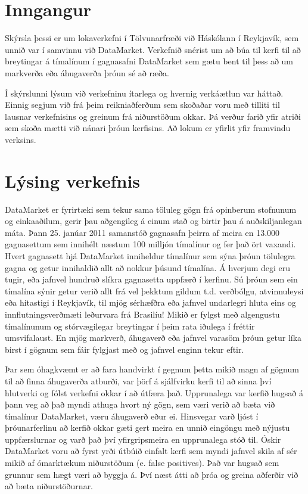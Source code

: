 \documentclass{article}
\begin{document}
\raggedright

\tableofcontents
\newpage

\section{Inngangur}
Skýrsla þessi er um lokaverkefni í Tölvunarfræði við Háskólann í
Reykjavík, 
sem unnið var í samvinnu við DataMarket. Verkefnið snérist um að búa til kerfi til að 
breytingar á tímalínum í gagnasafni DataMarket sem gætu bent til þess að um markverða eða áhugaverða þróun sé að ræða.

Í skýrslunni lýsum við verkefninu ítarlega og hvernig verkáætlun var háttað.
Einnig segjum við frá þeim reikniaðferðum sem skoðaðar voru með tilliti til 	
lausnar verkefnisins og greinum frá niðurstöðum okkar. Þá 
verður farið yfir atriði sem skoða mætti við nánari þróun kerfisins.
Að lokum er yfirlit yfir framvindu verksins.

\newpage
\section{Lýsing verkefnis}
\label{sec:description}
DataMarket er fyrirtæki sem tekur sama töluleg gögn frá opinberum
stofnunum og einkaaðilum, gerir þau aðgengileg á einum stað og birtir þau á
auðskiljanlegan máta. Þann 25. janúar 2011 samanstóð gagnasafn þeirra 
af meira en 13.000 gagnasettum sem innihélt næstum 100 milljón tímalínur og 
fer það ört vaxandi. Hvert gagnasett hjá DataMarket inniheldur tímalínur sem sýna þróun tölulegra
gagna og getur innihaldið allt að nokkur þúsund tímalína. 
Á hverjum degi eru tugir, eða jafnvel hundruð slíkra gagnasetta uppfærð í
kerfinu. Sú þróun sem ein tímalína sýnir getur verið allt frá vel þekktum gildum t.d. verðbólgu, atvinnuleysi eða
hitastigi í Reykjavík, til mjög sérhæfðra eða jafnvel undarlegri hluta eins og 
innflutningsverðmæti leðurvara frá Brasilíu! 
Mikið er fylgst með algengustu tímalínunum og stórvægilegar breytingar 
í þeim rata iðulega í fréttir umsvifalaust. 
En mjög markverð, áhugaverð eða jafnvel varasöm þróun getur líka birst 
í gögnum sem fáir fylgjast með og jafnvel enginn tekur eftir. 

Þar sem óhagkvæmt er að fara handvirkt í gegnum þetta mikið magn af gögnum 
til að finna áhugaverða atburði, var þörf á sjálfvirku kerfi til að 
sinna því hlutverki og fólst verkefni okkar í að útfæra það.
Upprunalega var kerfið hugsað á þann veg að það myndi athuga hvort ný gögn, sem
væri verið að bæta við tímalínur DataMarket, væru áhugaverð eður ei. Hinsvegar
varð ljóst í þróunarferlinu að kerfið okkar gæti gert meira en unnið
eingöngu með nýjustu uppfærslurnar og varð það því yfirgripsmeira en
upprunalega stóð til.
Óskir DataMarket voru að fyrst yrði útbúið einfalt kerfi sem myndi jafnvel 
skila af sér mikið af ómarktækum niðurstöðum (e. false positives). Það var hugsað
sem grunnur sem hægt væri að byggja á. Því næst átti að þróa og greina aðferðir við
að bæta niðurstöðurnar. 
\end{document}
